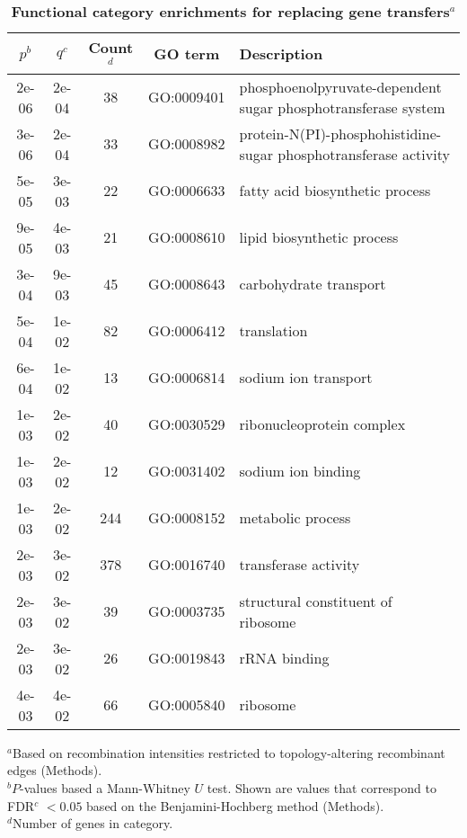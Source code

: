 \documentclass[12pt]{article}
\begin{document}

\begin{table}[!ht]
\caption{
{\bf Functional category enrichments for replacing gene transfers$^a$}} 
\vspace{1ex}
\noindent \begin{centering}
\begin{tabular}{ccccl}
\hline 
$p^b$ & $q^c$ & Count$^d$ & GO term & Description\\
\hline 
2e-06 & 2e-04 &  38 & GO:0009401 & phosphoenolpyruvate-dependent sugar phosphotransferase system\\
3e-06 & 2e-04 &  33 & GO:0008982 & protein-N(PI)-phosphohistidine-sugar phosphotransferase activity\\
5e-05 & 3e-03 &  22 & GO:0006633 & fatty acid biosynthetic process\\
9e-05 & 4e-03 &  21 & GO:0008610 & lipid biosynthetic process\\
3e-04 & 9e-03 &  45 & GO:0008643 & carbohydrate transport\\
5e-04 & 1e-02 &  82 & GO:0006412 & translation\\
6e-04 & 1e-02 &  13 & GO:0006814 & sodium ion transport\\
1e-03 & 2e-02 &  40 & GO:0030529 & ribonucleoprotein complex\\
1e-03 & 2e-02 &  12 & GO:0031402 & sodium ion binding\\
1e-03 & 2e-02 & 244 & GO:0008152 & metabolic process\\
2e-03 & 3e-02 & 378 & GO:0016740 & transferase activity\\
2e-03 & 3e-02 &  39 & GO:0003735 & structural constituent of ribosome\\
2e-03 & 3e-02 &  26 & GO:0019843 & rRNA binding\\
4e-03 & 4e-02 &  66 & GO:0005840 & ribosome\\
\hline 
\end{tabular}
\par\end{centering}
\begin{flushleft}
$^a$Based on recombination intensities restricted to topology-altering
recombinant edges (Methods).\\
$^b$$P$-values based a Mann-Whitney $U$ test.  Shown are values that
correspond to FDR$^c$  $<0.05$ based on the 
Benjamini-Hochberg method (Methods).\\
$^d$Number of genes in category.\\
\end{flushleft}
\label{tab:functional}
\end{table}
\clearpage{}
\end{document}
